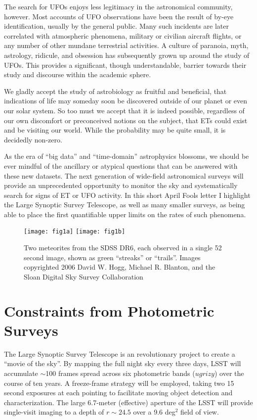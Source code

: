 \documentclass[iop]{emulateapj}
\begin{document}
The search for UFOs enjoys less legitimacy in the astronomical community, however. Most  accounts of UFO observations have been the result of by-eye identification, usually by the general public. Many such incidents are later correlated with atmospheric phenomena, military or civilian aircraft flights, or any number of other mundane terrestrial activities. A culture of paranoia, myth, astrology, ridicule, and obsession has subsequently grown up around the study of UFOs. This provides a significant, though understandable, barrier towards their study and discourse within the academic sphere.


We gladly accept the study of astrobiology as fruitful and beneficial, that indications of life may someday soon be discovered outside of our planet or even our solar system. So too must we accept that it is indeed possible, regardless of our own discomfort or preconceived notions on the subject, that ETs could exist and be visiting our world. While the probability may be quite small, it is decidedly non-zero.


As the era of ``big data'' and ``time-domain'' astrophysics blossoms, we should be ever mindful of the ancillary or atypical questions that can be answered with these new datasets. The next generation of wide-field astronomical surveys will provide an unprecedented opportunity to monitor the sky and systematically search for signs of ET or UFO activity. In this short April Fools letter I highlight the Large Synoptic Survey Telescope, as well as many smaller surveys, as being able to place the first quantifiable upper limits on the rates of such phenomena.



\begin{figure*}[t]
\centering
\texttt{[image: fig1a]}
\texttt{[image: fig1b]}
\caption{Two  meteorites from the SDSS DR6, each observed in a single 52 second image, shown as green ``streaks'' or ``trails''. Images copyrighted 2006 David W. Hogg, Michael R. Blanton, and the Sloan Digital Sky Survey Collaboration}
\label{asteroids}
\end{figure*}




\section{Constraints from Photometric Surveys}
The Large Synoptic Survey Telescope \cite[LSST;][]{lsst} is an revolutionary project to create a ``movie of the sky''. By mapping the full night sky every three days, LSST will accumulate $\sim$100 frames spread across six photometric bands ($ugrizy$) over the course of ten years. A freeze-frame strategy will be employed, taking two 15 second exposures at each pointing to facilitate moving object detection and characterization. The large 6.7-meter (effective) aperture of the LSST will provide single-visit imaging to a depth of $r\sim24.5$ over a 9.6 deg$^2$ field of view. 
\end{document}
